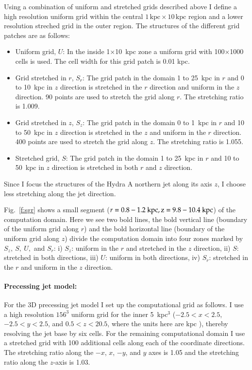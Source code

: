 Using a combination of uniform and stretched grids described above I define a high resolution uniform grid within the central $1\,\mathrm{kpc}\times10\,\mathrm{kpc}$ region and a lower resolution streched grid in the outer region. The structures of the different grid patches are as follows: \\
\begin{itemize}
\item Uniform grid, $U$: In the inside 1$\times$10~kpc zone a uniform grid with 100$\times$1000 cells is used. The cell width for this grid patch is 0.01 kpc. 
\item Grid stretched in $r$, $S_r$: The grid patch in the domain 1 to 25~kpc in $r$ and 0 to 10~kpc in $z$ direction is stretched in the $r$ direction and uniform in the $z$ direction. 90 points are used to stretch the grid along $r$. The stretching ratio is 1.009.  
\item Grid stretched in $z$, $S_z$: The grid patch in the domain 0 to 1~kpc in $r$ and 10 to 50~kpc in $z$ direction is stretched in the $z$ and uniform in the $r$ direction. 400 points are used to stretch the grid along $z$. The stretching ratio is 1.055. 
\item Stretched grid, $S$: The grid patch in the domain 1 to 25~kpc in $r$ and 10 to 50~kpc in $z$ direction is stretched in both $r$ and $z$ direction.
\end{itemize}
Since I focus the structures of the Hydra A northern jet along its axis $z$, I choose less stretching along the jet direction.
 
 Fig.~\ref{f:sgr} shows a small segment ($r= 0.8 - 1.2~ \rm kpc, z = 9.8-10.4~\rm kpc$) of the computation domain. Here we see two bold lines, the bold vertical line (boundary of the uniform grid along $r$) and the bold horizontal line (boundary of the uniform grid along $z$) divide the computation domain into four zones marked by $S_z, \ S, \ U,$ and $S_r$: i) $S_z$: uniform in the $r$ and stretched in the $z$ direction, ii) $S$: stretched in both directions, iii) $U$: uniform in both directions, iv) $S_r$: stretched in the $r$ and uniform in the $z$ direction. 
 
 \paragraph{Precessing jet model:}
 For the 3D precessing jet model I set up the computational grid as follows. I use a high resolution $156^3$ uniform grid for the inner 5~kpc$^3$ ($-2.5 < x < 2.5$, $-2.5 < y < 2.5$, and $0.5 < z < 20.5$, where the units here are kpc ), thereby resolving the jet base by six cells. For the remaining computational domain I use a stretched grid with 100 additional cells along each of the coordinate directions. The stretching ratio along the $-x$, $x$, $-y$, and $y$ axes is 1.05 and the stretching ratio along the $z$-axis is 1.03. 

